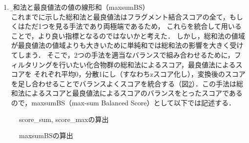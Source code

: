 \begin{enumerate}
\item \b{総和法と最良値法の値の線形和（maxsumBS）}\\
これまでに示した総和法と最良値法はフラグメント結合スコアの全て，もしくはただ1つを見る手法であり両極端であるため，
これらを統合して用いることで，より良い指標となるのではないかと考えた．
しかし，総和法の値域が最良値法の値域よりも大きいために単純和では総和法の影響を大きく受けてしまう．
そこで，2つの手法を適当なバランスで組み合わせるために，フィルタリングを行いたい化合物群の総和法によるスコア，最良値法によるスコアを
それぞれ平均0，分散1にし（すなわちzスコア化し），変換後のスコアを足し合わせることでバランスよくスコアを統合する（図\ref{fig:maxsumBS}）．この手法は総和法によるスコアと最良値法によるスコアのバランスをとったスコアであるので，maxsumBS（max-sum Balanced Score）として以下では記述する．
\end{enumerate}

\begin{figure}[p]
 \begin{center}
  \caption{score\_sum, score\_maxの算出}
  \label{fig:scoring}
 \end{center}
\end{figure}

\begin{figure}[p]
 \begin{center}
  \caption{maxsumBSの算出}
  \label{fig:maxsumBS}
 \end{center}
\end{figure}